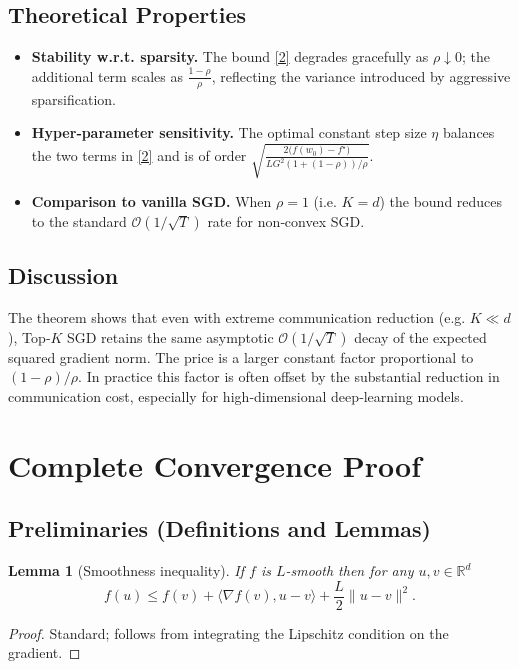 \documentclass[11pt]{article}
\newtheorem{lemma}{Lemma}
\newcommand{\R}{\mathbb{R}}
\begin{document}
\subsection*{Theoretical Properties}
\begin{itemize}
\item \textbf{Stability w.r.t. sparsity.}
The bound \eqref{2} degrades gracefully as \(\rho\downarrow 0\);
the additional term scales as \(\frac{1-\rho}{\rho}\), reflecting the variance
introduced by aggressive sparsification.
\item \textbf{Hyper‑parameter sensitivity.}
The optimal constant step size \(\eta\) balances the two terms in \eqref{2} and
is of order \(\sqrt{\frac{2\big(f(w_0)-f^\star\big)}{L G^{2}(1+(1-\rho))/\rho}}\).
\item \textbf{Comparison to vanilla SGD.}
When \(\rho=1\) (i.e. \(K=d\)) the bound reduces to the standard
\(\mathcal{O}(1/\sqrt{T})\) rate for non‑convex SGD.
\end{itemize}

\subsection*{Discussion}
The theorem shows that even with extreme communication reduction (e.g.
\(K\ll d\)), Top‑\(K\) SGD retains the same asymptotic
\(\mathcal{O}(1/\sqrt{T})\) decay of the expected squared gradient norm.
The price is a larger constant factor proportional to \((1-\rho)/\rho\).
In practice this factor is often offset by the substantial reduction
in communication cost, especially for high‑dimensional deep‑learning models.

\section*{Complete Convergence Proof}
\subsection*{Preliminaries (Definitions and Lemmas)}
\begin{lemma}[Smoothness inequality]\label{lem:smooth}
If \(f\) is \(L\)-smooth then for any \(u,v\in\R^{d}\)
\[
f(u) \le f(v)+\langle\nabla f(v),u-v\rangle+\frac{L}{2}\|u-v\|^{2}.
\]
\end{lemma}
\begin{proof}
Standard; follows from integrating the Lipschitz condition on the gradient.
\end{proof}
\end{document}

